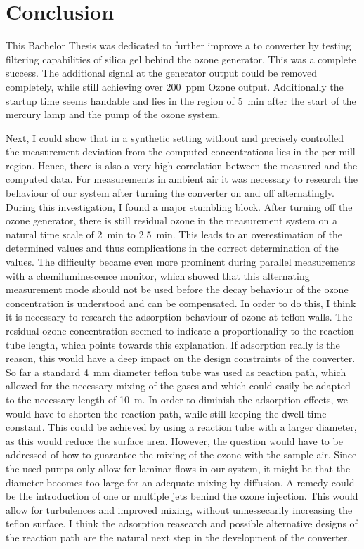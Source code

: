 \section{Conclusion}
\label{sec:conclusion}

This Bachelor Thesis was dedicated to further improve a  to
 converter by testing filtering capabilities of silica gel
behind the ozone generator. This was a complete success. The
additional  signal at the generator output could be removed
completely, while still achieving over \SI{200}{ppm} Ozone
output. Additionally the startup time seems handable and lies in the
region of \SI{5}{\minute} after the start of the mercury lamp and the
pump of the ozone system. 

Next, I could show that in a synthetic setting without  and
precisely controlled  the measurement deviation from the
computed  concentrations lies in the per mill region. Hence,
there is also a very high correlation between the measured and the
computed data. For measurements in ambient air it was necessary to
research the behaviour of our system after turning the converter on
and off alternatingly. During this investigation, I found a major
stumbling block. After turning off the ozone generator, there is still
residual ozone in the measurement system on a natural time scale of
\SI{2}{\minute} to \SI{2.5}{\minute}. This leads to an overestimation
of the determined  values and thus complications in the
correct determination of the  values. The difficulty became
even more prominent during parallel measurements with a
chemiluminescence monitor, which showed that this alternating
measurement mode should not be used before the decay behaviour of the
ozone concentration is understood and can be compensated. In order to
do this, I think it is necessary to research the adsorption behaviour
of ozone at teflon walls. The residual ozone concentration seemed to
indicate a proportionality to the reaction tube length, which points
towards this explanation. If adsorption really is the reason, this
would have a deep impact on the design constraints of the
converter. So far a standard \SI{4}{\milli\meter} diameter teflon tube
was used as reaction path, which allowed for the necessary mixing of
the gases and which could easily be adapted to the necessary length of
\SI{10}{\meter}. In order to diminish the adsorption effects, we would
have to shorten the reaction path, while still keeping the dwell time
constant. This could be achieved by using a reaction tube with a
larger diameter, as this would reduce the surface area. However, the
question would have to be addressed of how to guarantee the mixing of
the ozone with the sample air. Since the used pumps only allow for
laminar flows in our system, it might be that the diameter becomes too
large for an adequate mixing by diffusion. A remedy could be the
introduction of one or multiple jets behind the ozone injection. This
would allow for turbulences and improved mixing, without unnessecarily
increasing the teflon surface. I think the adsorption reasearch and
possible alternative designs of the reaction path are the natural next
step in the development of the converter.


